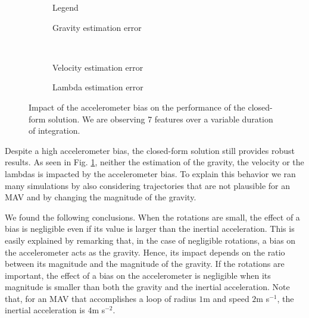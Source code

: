 \documentclass[letterpaper, 10pt, conference, final]{ieeeconf}  %
\begin{document}
\begin{figure}[!h]
  \centering
        \hspace{0.2\columnwidth}%
        \begin{subfigure}[b]{0.3\columnwidth}
                \resizebox{\columnwidth}{!}{}
                \caption{Legend}

        \end{subfigure}%
        \begin{subfigure}[b]{0.5\columnwidth}
                \resizebox{\columnwidth}{!}{}
                \caption{Gravity estimation error}

        \end{subfigure}
        ~
        \begin{subfigure}[b]{0.5\columnwidth}
                \resizebox{\columnwidth}{!}{}
                \caption{Velocity estimation error}

        \end{subfigure}%
        \begin{subfigure}[b]{0.5\columnwidth}
                \resizebox{\columnwidth}{!}{}
                \caption{Lambda estimation error}

        \end{subfigure}
        \caption{Impact of the accelerometer bias on the performance of the closed-form solution. We are observing 7 features  over a variable duration of integration.\label{fig:biasAccCF}}
\end{figure}

Despite a high accelerometer bias, the closed-form solution still provides robust results.
As seen in Fig. \ref{fig:biasAccCF}, neither the estimation of the gravity, the velocity or the lambdas is impacted by the accelerometer bias.
To explain this behavior we ran many simulations by also considering trajectories that are not plausible for an MAV and by changing the magnitude of the gravity.

We found the following conclusions. When the rotations are small, the effect of a bias is negligible even if its value is larger than the inertial acceleration. This is easily explained by remarking that, in the case of negligible rotations, a bias on the accelerometer acts as the gravity. Hence, its impact depends on the ratio between its magnitude and the magnitude of the gravity.
If the rotations are important, the effect of a bias on the accelerometer is negligible when its magnitude is smaller than both the gravity and the inertial acceleration. Note that, for an MAV that accomplishes a loop of radius $1$m and speed $2$m s$^{-1}$, the inertial acceleration is $4$m s$^{-2}$.
\end{document}
